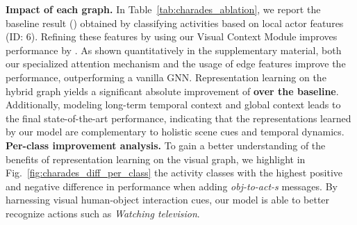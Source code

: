 \documentclass[runningheads]{llncs}
\begin{document}
\begin{table}[ht]
\caption{\textbf{Ablation analysis on Charades~\cite{Sigurdsson:ECCV16}}. \emph{Visual}: Visual Context Module. \emph{Semantic}: Semantic Context Module. \emph{Long Term}: long-term temporal modeling.}
\centering
{}
\label{tab:charades_ablation}
\end{table}
\noindent\textbf{Impact of each graph.} In Table~\ref{tab:charades_ablation}, we report the baseline result  () obtained by classifying activities based on local actor features (ID: 6). Refining these features by using our Visual Context Module improves performance by . As shown quantitatively in the supplementary material,  both our specialized attention mechanism and the usage of edge features improve the performance, outperforming a vanilla GNN. Representation learning on the hybrid graph yields a significant absolute improvement of \textbf{ over the baseline}. Additionally, modeling long-term temporal context and global context leads to the final state-of-the-art performance, indicating that the representations learned by our model are complementary to holistic scene cues and temporal dynamics.\\
\textbf{Per-class improvement analysis.}
To gain a better understanding of the benefits of representation learning on the visual graph,  we highlight in Fig.~\ref{fig:charades_diff_per_class} the activity classes with the highest positive and negative difference in performance when adding \emph{obj-to-act-s} messages. By harnessing visual human-object interaction cues, our model is able to better recognize actions such as \emph{Watching television}. \\
\end{document}

